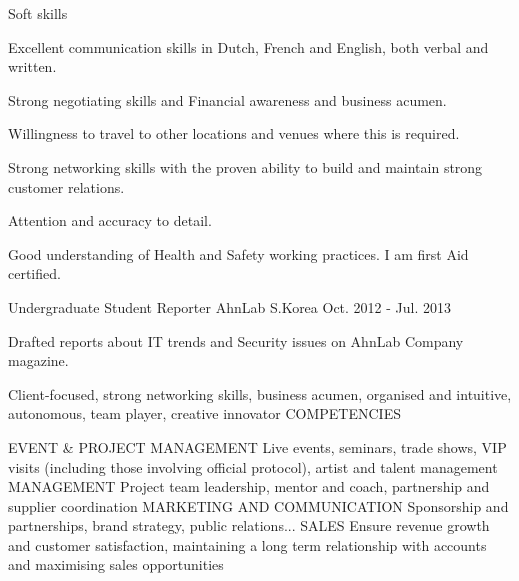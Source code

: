 \documentclass[11pt, a4paper]{awesome-cv}
\begin{document}
\begin{cventries}
	\cventry
	{Soft skills}
	{}
	{}
	{}
	{
		\begin{cvitems}
		\item Excellent communication skills in Dutch, French and English, both verbal and written.
		\item Strong negotiating skills and Financial awareness and business acumen.
		\item Willingness to travel to other locations and venues where this is required.
		\item Strong networking skills with the proven ability to build and maintain strong customer relations.
		\item Attention and accuracy to detail.
		\item Good understanding of Health and Safety working practices. I am first Aid certified.
		\end{cvitems}
	}
	\cventry
	{Undergraduate Student Reporter}
	{AhnLab}
	{S.Korea}
	{Oct. 2012 - Jul. 2013}
	{
		\begin{cvitems}
			\item {Drafted reports about IT trends and Security issues on AhnLab Company magazine.}
		\end{cvitems}
	}
\end{cventries}



Client-focused, strong networking skills, business acumen, organised and intuitive, autonomous, team player, creative innovator
COMPETENCIES

EVENT \& PROJECT MANAGEMENT
Live events, seminars, trade shows, VIP visits (including those involving official protocol), artist and talent management
MANAGEMENT
Project team leadership, mentor and coach, partnership and supplier coordination
MARKETING AND COMMUNICATION
Sponsorship and partnerships, brand strategy, public relations...
SALES
Ensure revenue growth and customer satisfaction, maintaining a long term relationship with accounts and maximising sales opportunities
\end{document}
